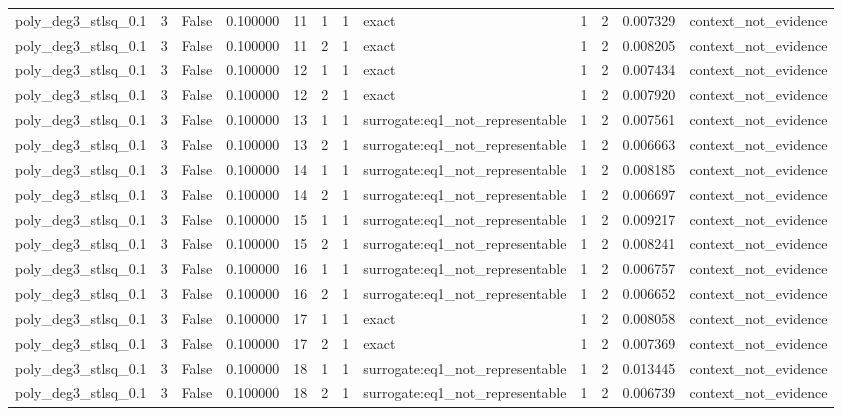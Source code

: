 \begin{tabular}{lrrrrrrlrrrl}
poly\_deg3\_stlsq\_0.1 & 3 & False & 0.100000 & 11 & 1 & 1 & exact & 1 & 2 & 0.007329 & context\_not\_evidence \\
poly\_deg3\_stlsq\_0.1 & 3 & False & 0.100000 & 11 & 2 & 1 & exact & 1 & 2 & 0.008205 & context\_not\_evidence \\
poly\_deg3\_stlsq\_0.1 & 3 & False & 0.100000 & 12 & 1 & 1 & exact & 1 & 2 & 0.007434 & context\_not\_evidence \\
poly\_deg3\_stlsq\_0.1 & 3 & False & 0.100000 & 12 & 2 & 1 & exact & 1 & 2 & 0.007920 & context\_not\_evidence \\
poly\_deg3\_stlsq\_0.1 & 3 & False & 0.100000 & 13 & 1 & 1 & surrogate:eq1\_not\_representable & 1 & 2 & 0.007561 & context\_not\_evidence \\
poly\_deg3\_stlsq\_0.1 & 3 & False & 0.100000 & 13 & 2 & 1 & surrogate:eq1\_not\_representable & 1 & 2 & 0.006663 & context\_not\_evidence \\
poly\_deg3\_stlsq\_0.1 & 3 & False & 0.100000 & 14 & 1 & 1 & surrogate:eq1\_not\_representable & 1 & 2 & 0.008185 & context\_not\_evidence \\
poly\_deg3\_stlsq\_0.1 & 3 & False & 0.100000 & 14 & 2 & 1 & surrogate:eq1\_not\_representable & 1 & 2 & 0.006697 & context\_not\_evidence \\
poly\_deg3\_stlsq\_0.1 & 3 & False & 0.100000 & 15 & 1 & 1 & surrogate:eq1\_not\_representable & 1 & 2 & 0.009217 & context\_not\_evidence \\
poly\_deg3\_stlsq\_0.1 & 3 & False & 0.100000 & 15 & 2 & 1 & surrogate:eq1\_not\_representable & 1 & 2 & 0.008241 & context\_not\_evidence \\
poly\_deg3\_stlsq\_0.1 & 3 & False & 0.100000 & 16 & 1 & 1 & surrogate:eq1\_not\_representable & 1 & 2 & 0.006757 & context\_not\_evidence \\
poly\_deg3\_stlsq\_0.1 & 3 & False & 0.100000 & 16 & 2 & 1 & surrogate:eq1\_not\_representable & 1 & 2 & 0.006652 & context\_not\_evidence \\
poly\_deg3\_stlsq\_0.1 & 3 & False & 0.100000 & 17 & 1 & 1 & exact & 1 & 2 & 0.008058 & context\_not\_evidence \\
poly\_deg3\_stlsq\_0.1 & 3 & False & 0.100000 & 17 & 2 & 1 & exact & 1 & 2 & 0.007369 & context\_not\_evidence \\
poly\_deg3\_stlsq\_0.1 & 3 & False & 0.100000 & 18 & 1 & 1 & surrogate:eq1\_not\_representable & 1 & 2 & 0.013445 & context\_not\_evidence \\
poly\_deg3\_stlsq\_0.1 & 3 & False & 0.100000 & 18 & 2 & 1 & surrogate:eq1\_not\_representable & 1 & 2 & 0.006739 & context\_not\_evidence \\

\end{tabular}
